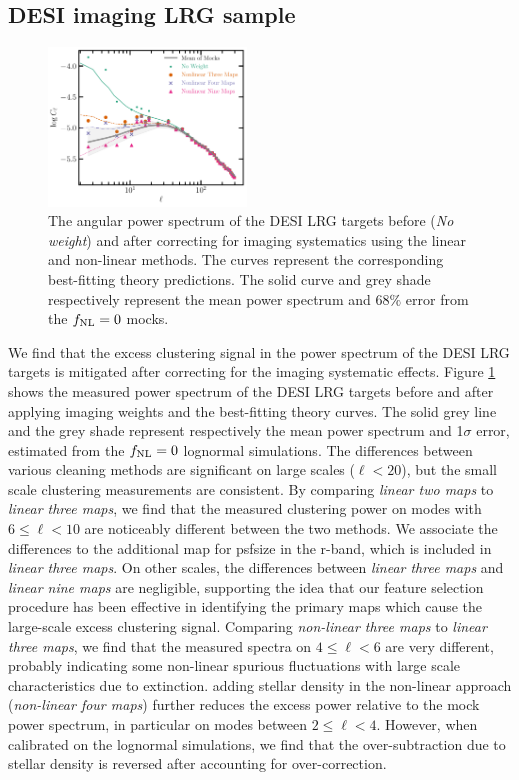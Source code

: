 \subsection{DESI imaging LRG sample}
\begin{figure}
    \centering
    \includegraphics[width=0.47\textwidth]{figures/model_dr9.pdf} 
    \caption{The angular power spectrum of the DESI LRG targets before (\textit{No weight}) and after correcting for imaging systematics using the linear and non-linear methods. The curves represent the corresponding best-fitting theory predictions. The solid curve and grey shade respectively represent the mean power spectrum and $68\%$ error from the $f_{\rm NL}=0$ mocks.}
    \label{fig:cl_dr9}
\end{figure}
We find that the excess clustering signal in the power spectrum of the DESI LRG targets is mitigated after correcting for the imaging systematic effects. Figure \ref{fig:cl_dr9} shows the measured power spectrum of the DESI LRG targets before and after applying imaging weights and the best-fitting theory curves. The solid grey line and the grey shade represent respectively the mean power spectrum and 1$\sigma$ error, estimated from the $f_{\rm NL}=0$ lognormal simulations. The differences between various cleaning methods are significant on large scales ($\ell < 20$), but the small scale clustering measurements are consistent.  By comparing \textit{linear two maps} to \textit{linear three maps}, we find that the measured clustering power on modes with $6\leq \ell < 10$ are noticeably different between the two methods. We associate the differences to the additional map for psfsize in the r-band, which is included in \textit{linear three maps}. On other scales, the differences between \textit{linear three maps} and \textit{linear nine maps} are negligible, supporting the idea that our feature selection procedure has been effective in identifying the primary maps which cause the large-scale excess clustering signal. Comparing \textit{non-linear three maps} to \textit{linear three maps}, we find that the measured spectra on $4 \leq \ell < 6$ are very different, probably indicating some non-linear spurious fluctuations with large scale characteristics due to extinction.  adding stellar density in the non-linear approach (\textit{non-linear four maps}) further reduces the excess power relative to the mock power spectrum, in particular on modes between $2\leq \ell < 4$. However, when calibrated on the lognormal simulations, we find that the over-subtraction due to stellar density is reversed after accounting for over-correction.


